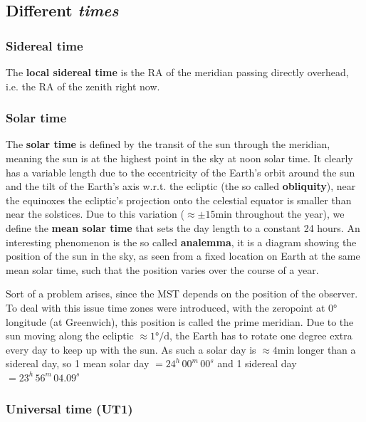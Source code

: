 \documentclass[a4paper]{article}
\begin{document}
\subsection{Different \textit{times}}

\subsubsection*{Sidereal time}

The \textbf{local sidereal time} is the RA of the meridian passing directly overhead, i.e. the RA of the zenith right now.

\subsubsection*{Solar time}

The \textbf{solar time} is defined by the transit of the sun through the meridian, meaning the sun is at the highest point in the sky at noon solar time. It clearly has a variable length due to the eccentricity of the Earth's orbit around the sun and the tilt of the Earth's axis w.r.t. the ecliptic (the so called \textbf{obliquity}), near the equinoxes the ecliptic's projection onto the celestial equator is smaller than near the solstices. Due to this variation ($\approx\pm 15 \si{\minute}$ throughout the year), we define the \textbf{mean solar time} that sets the day length to a constant 24 hours. An interesting phenomenon is the so called \textbf{analemma}, it is a diagram showing the position of the sun in the sky, as seen from a fixed location on Earth at the same mean solar time, such that the position varies over the course of a year. 

\bigskip

Sort of a problem arises, since the MST depends on the position of the observer. To deal with this issue time zones were introduced, with the zeropoint at $0\si{\degree}$ longitude (at Greenwich), this position is called the prime meridian. Due to the sun moving along the ecliptic $\approx 1\si{\degree\per\day}$, the Earth has to rotate one degree extra every day to keep up with the sun. As such a solar day is $\approx 4\si{\minute}$ longer than a sidereal day, so 1 mean solar day $= 24^h\,00^m\,00^s$ and 1 sidereal day $= 23^h\,56^m\,04.09^s$

\subsubsection*{Universal time (UT1)}
\end{document}
